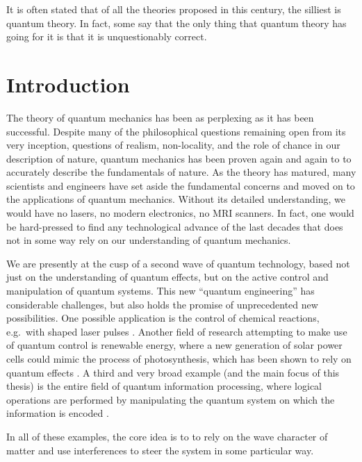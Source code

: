 \begin{savequote}[75mm]
It is often stated that of all the theories proposed in this century, the
silliest is quantum theory. In fact, some say that the only thing that quantum
theory has going for it is that it is unquestionably correct.
\end{savequote}

\chapter{Introduction}
\label{chap:introduction}

The theory of quantum mechanics has been as perplexing as it has been
successful. Despite many of the philosophical questions remaining open from its
very inception, questions of realism, non-locality, and the role of chance in
our description of nature, quantum mechanics has been proven again and again to
to accurately describe the fundamentals of nature. As the theory has matured,
many scientists and engineers have set aside the fundamental concerns and moved
on to the applications of quantum mechanics. Without its detailed understanding,
we would have no lasers, no modern electronics, no MRI scanners. In fact, one
would be hard-pressed to find any technological advance of the last decades that
does not in some way rely on our understanding of quantum mechanics.

We are presently at the cusp of a second wave of quantum technology, based not
just on the understanding of quantum effects, but on the active control and
manipulation of quantum systems. This new ``quantum engineering'' has
considerable challenges, but also holds the promise of unprecedented new
possibilities. One possible application is the control of chemical
reactions, e.g.\ with shaped laser pulses \cite{BrumerShapiro}.
Another field of research attempting to make use of quantum control is renewable
energy, where a new generation of solar power cells could mimic the process of
photosynthesis, which has been shown to rely on quantum effects
\cite{ColliniScience09, SarovarNatPhys10}.  A third and very broad example (and
the main focus of this thesis) is the entire field of quantum information
processing, where logical operations are performed by manipulating the quantum
system on which the information is encoded \cite{NielsenChuang}.

In all of these examples, the core idea is to to rely on the wave character
of matter and use interferences to steer the system in some particular way.



